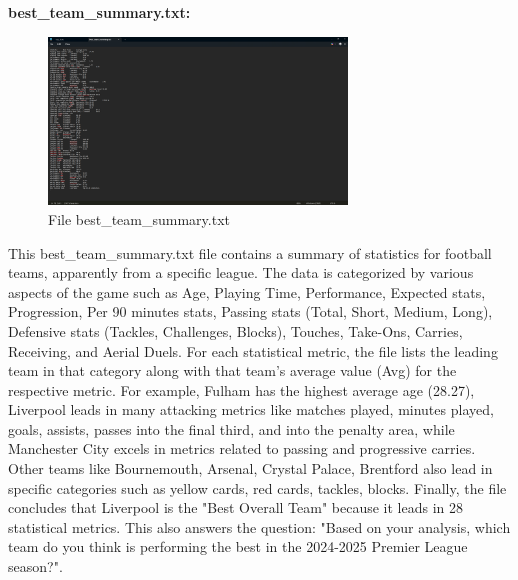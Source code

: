 \documentclass[12pt]{report}
\begin{document}
{{\textbf{best\_team\_summary.txt:} %
\begin{figure}[h]
    \centering
    \includegraphics[width=300px]{best_team_summary.png}
    \caption{File best\_team\_summary.txt} %
    \label{fig:p8}
\end{figure}
This best\_team\_summary.txt file contains a summary of statistics for football teams, apparently from a specific league. The data is categorized by various aspects of the game such as Age, Playing Time, Performance, Expected stats, Progression, Per 90 minutes stats, Passing stats (Total, Short, Medium, Long), Defensive stats (Tackles, Challenges, Blocks), Touches, Take-Ons, Carries, Receiving, and Aerial Duels.
For each statistical metric, the file lists the leading team in that category along with that team's average value (Avg) for the respective metric. For example, Fulham has the highest average age (28.27), Liverpool leads in many attacking metrics like matches played, minutes played, goals, assists, passes into the final third, and into the penalty area, while Manchester City excels in metrics related to passing and progressive carries. Other teams like Bournemouth, Arsenal, Crystal Palace, Brentford also lead in specific categories such as yellow cards, red cards, tackles, blocks.
Finally, the file concludes that Liverpool is the "Best Overall Team" because it leads in 28 statistical metrics. This also answers the question: "Based on your analysis, which team do you think is performing the best in the 2024-2025 Premier League season?".
}}
\end{document}
